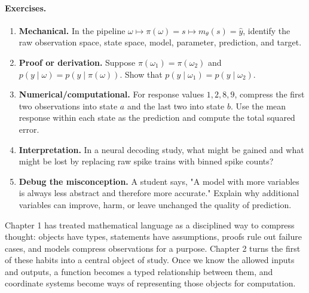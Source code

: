 \paragraph{Exercises.}
\begin{enumerate}[label=\textbf{1.4.\arabic*.}, leftmargin=*]
\item \textbf{Mechanical.} In the pipeline \(\omega\mapsto \pi(\omega)=s\mapsto m_\theta(s)=\hat y\), identify the raw observation space, state space, model, parameter, prediction, and target.
\item \textbf{Proof or derivation.} Suppose \(\pi(\omega_1)=\pi(\omega_2)\) and \(p(y\mid\omega)=p(y\mid\pi(\omega))\). Show that \(p(y\mid\omega_1)=p(y\mid\omega_2)\).
\item \textbf{Numerical/computational.} For response values \(1,2,8,9\), compress the first two observations into state \(a\) and the last two into state \(b\). Use the mean response within each state as the prediction and compute the total squared error.
\item \textbf{Interpretation.} In a neural decoding study, what might be gained and what might be lost by replacing raw spike trains with binned spike counts?
\item \textbf{Debug the misconception.} A student says, "A model with more variables is always less abstract and therefore more accurate." Explain why additional variables can improve, harm, or leave unchanged the quality of prediction.
\end{enumerate}

Chapter 1 has treated mathematical language as a disciplined way to compress thought: objects have types, statements have assumptions, proofs rule out failure cases, and models compress observations for a purpose. Chapter 2 turns the first of these habits into a central object of study. Once we know the allowed inputs and outputs, a function becomes a typed relationship between them, and coordinate systems become ways of representing those objects for computation.

\clearpage
